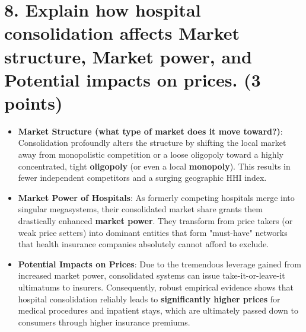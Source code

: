 \documentclass[11pt, letterpaper]{article}
\begin{document}
\section*{8. Explain how hospital consolidation affects Market structure, Market power, and Potential impacts on prices. (3 points)}

\begin{itemize}[leftmargin=*]
    \item \textbf{Market Structure (what type of market does it move toward?)}: Consolidation profoundly alters the structure by shifting the local market away from monopolistic competition or a loose oligopoly toward a highly concentrated, tight \textbf{oligopoly} (or even a local \textbf{monopoly}). This results in fewer independent competitors and a surging geographic HHI index.
    \item \textbf{Market Power of Hospitals}: As formerly competing hospitals merge into singular megasystems, their consolidated market share grants them drastically enhanced \textbf{market power}. They transform from price takers (or weak price setters) into dominant entities that form "must-have" networks that health insurance companies absolutely cannot afford to exclude.
    \item \textbf{Potential Impacts on Prices}: Due to the tremendous leverage gained from increased market power, consolidated systems can issue take-it-or-leave-it ultimatums to insurers. Consequently, robust empirical evidence shows that hospital consolidation reliably leads to \textbf{significantly higher prices} for medical procedures and inpatient stays, which are ultimately passed down to consumers through higher insurance premiums.
\end{itemize}
\end{document}
